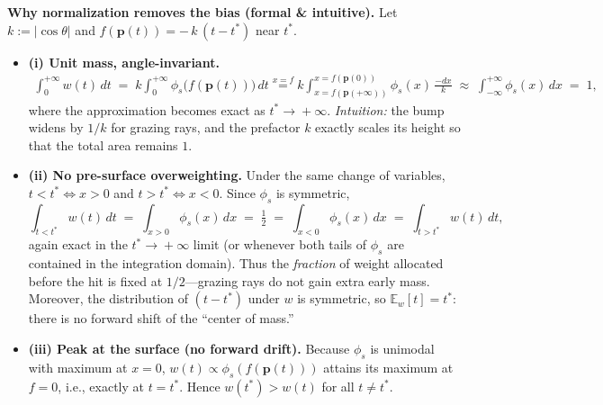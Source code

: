 \begin{enrichment}
\begin{enrichment}
        \medskip
        \noindent\textbf{Why normalization removes the bias (formal \& intuitive).}
        Let $k := |\cos\theta|$ and $f(\mathbf{p}(t)) = -\,k\,(t-t^*)$ near $t^*$.
        \begin{itemize}
            \item \textbf{(i) Unit mass, angle-invariant.}
            \vspace{-0.5ex}
            \begin{align}
                \int_{0}^{+\infty} w(t)\,dt
                \;=\; k \!\int_{0}^{+\infty} \phi_s\!\big(f(\mathbf{p}(t))\big)\,dt
                \overset{x=f}{=}
                k \!\int_{x=f(\mathbf{p}(+\infty))}^{x=f(\mathbf{p}(0))}
                \phi_s(x)\,\frac{-dx}{k}
                \;\approx\;
                \int_{-\infty}^{+\infty} \phi_s(x)\,dx
                \;=\; 1,
            \end{align}
            where the approximation becomes exact as $t^*\!\to\!+\infty$.  
            \emph{Intuition:} the bump widens by $1/k$ for grazing rays, and the prefactor $k$ exactly scales its height so that the total area remains $1$.
            \item \textbf{(ii) No pre-surface overweighting.}  
            Under the same change of variables, $t<t^*\!\iff\!x>0$ and $t>t^*\!\iff\!x<0$.  
            Since $\phi_s$ is symmetric,
            \begin{equation}
                \int_{t<t^*} w(t)\,dt
                \;=\; \int_{x>0} \phi_s(x)\,dx
                \;=\; \tfrac{1}{2}
                \;=\; \int_{x<0} \phi_s(x)\,dx
                \;=\; \int_{t>t^*} w(t)\,dt,
            \end{equation}
            again exact in the $t^*\!\to\!+\infty$ limit (or whenever both tails of $\phi_s$ are contained in the integration domain).  
            Thus the \emph{fraction} of weight allocated before the hit is fixed at $1/2$—grazing rays do not gain extra early mass.  
            Moreover, the distribution of $(t-t^*)$ under $w$ is symmetric, so $\mathbb{E}_w[t]=t^*$: there is no forward shift of the “center of mass.”
            \item \textbf{(iii) Peak at the surface (no forward drift).}  
            Because $\phi_s$ is unimodal with maximum at $x=0$, $w(t)\propto\phi_s(f(\mathbf{p}(t)))$ attains its maximum at $f=0$, i.e., exactly at $t=t^*$.  
            Hence $w(t^*) > w(t)$ for all $t \neq t^*$.
        \end{itemize}
        

\end{enrichment}
\end{enrichment}

